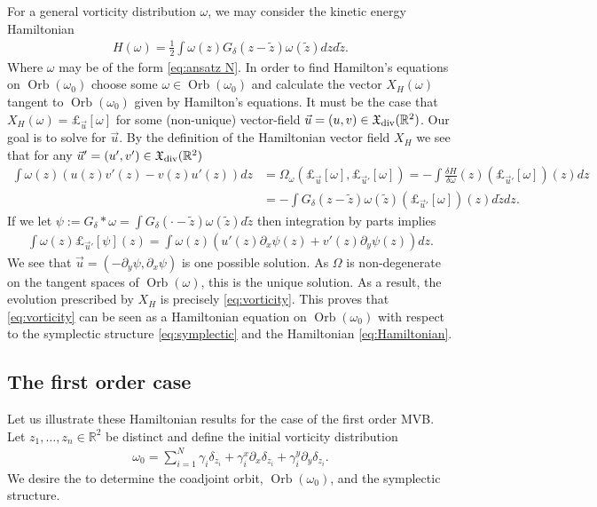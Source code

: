 \documentclass[12pt]{amsart}
\newcommand{\R}{\ensuremath{\mathbb{R}}}
\theoremstyle{remark}
\DeclareMathOperator{\Orb}{Orb}
\begin{document}
For a general vorticity distribution $\omega$, we may consider the kinetic energy Hamiltonian
\begin{align}
  H(\omega) = \frac{1}{2} \int \omega(z) G_\delta(z-\tilde{z}) \omega(\tilde{z}) dz d\tilde{z}. \label{eq:Hamiltonian}
\end{align}
Where $\omega$ may be of the form \eqref{eq:ansatz N}.
  In order to find Hamilton's equations on $\Orb(\omega_0)$ choose some $\omega \in \Orb(\omega_0)$ and calculate the vector $X_H(\omega)$ tangent to $\Orb(\omega_0)$
  given by Hamilton's equations.
  It must be the case that $X_H(\omega) =  \pounds_{\vec{u}}[\omega]$ for some (non-unique) vector-field $\vec{u} = (u,v) \in \mathfrak{X}_{\rm div}(\R^2)$.
  Our goal is to solve for $\vec{u}$.
  By the definition of the Hamiltonian vector field $X_H$ we see that for any
  $\vec{u}' = (u',v') \in \mathfrak{X}_{\rm div}(\R^2)$
  \begin{align*}
    \int \omega(z) \left( u(z) v'(z)  - v(z) u'(z) \right) dz &=
    \Omega_{\omega}( \pounds_{\vec{u}}[\omega] , \pounds_{\vec{u}'}[\omega] ) = - \int \frac{\delta H}{\delta \omega} (z) \left( \pounds_{\vec{u}'}[\omega] \right)(z) dz  \\
    &= - \int G_\delta(z-\tilde{z}) \omega (\tilde{z}) \left( \pounds_{\vec{u}'}[\omega] \right)(z) d\tilde{z} dz .
  \end{align*}
  If we let $\psi := G_\delta*\omega = \int G_\delta(\cdot -\tilde{z}) \omega (\tilde{z}) d \tilde{z}$ then integration by parts implies
  \begin{align*}
     \int \omega(z) \pounds_{\vec{u}'}[\psi](z) 
    =  \int \omega(z)  \left( u'(z) \partial_x \psi (z)+ v'(z) \partial_y \psi(z) \right) dz.
  \end{align*}
  We see that $\vec{u} = (-\partial_y \psi,\partial_x \psi)$ is one possible solution.
  As $\Omega$ is non-degenerate on the tangent spaces of $\Orb(\omega)$, this is the unique solution.
  As a result, the evolution prescribed by $X_H$ is precisely \eqref{eq:vorticity}.
  This proves that \eqref{eq:vorticity} can be seen as a Hamiltonian equation on $\Orb(\omega_0)$ with respect to the symplectic structure \eqref{eq:symplectic} and the Hamiltonian \eqref{eq:Hamiltonian}.

\subsection{The first order case}
Let us illustrate these Hamiltonian results for the case of the first order MVB.
Let $z_1,\dots,z_n \in \R^2$ be distinct
and define the initial vorticity distribution
\begin{align*}
  \omega_0 = \sum_{i=1}^N \gamma_i \delta_{z_i} + \gamma_i^x \partial_x \delta_{z_i} + \gamma_i^y \partial_{y} \delta_{z_i}.
\end{align*}
We desire the to determine the coadjoint orbit, $\Orb(\omega_0)$, and the symplectic structure.
\end{document}
